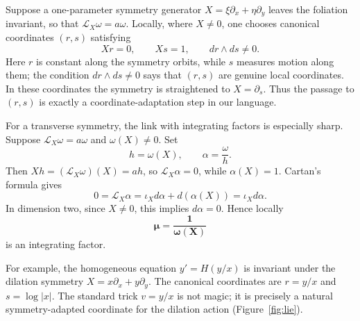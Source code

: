 \documentclass[11pt]{article}
\theoremstyle{definition}
\newcommand{\Lie}{\mathcal{L}}
\begin{document}
Suppose a one-parameter symmetry generator \(X=\xi\partial_x+\eta\partial_y\) leaves the foliation invariant, so that \(\Lie_X\omega=a\omega\). Locally, where \(X\neq0\), one chooses canonical coordinates \((r,s)\) satisfying
\[
Xr=0,\qquad Xs=1,\qquad dr\wedge ds\neq0.
\]
Here \(r\) is constant along the symmetry orbits, while \(s\) measures motion along them; the condition \(dr\wedge ds\neq0\) says that \((r,s)\) are genuine local coordinates. In these coordinates the symmetry is straightened to \(X=\partial_s\). Thus the passage to \((r,s)\) is exactly a coordinate-adaptation step in our language.

For a transverse symmetry, the link with integrating factors is especially sharp. Suppose \(\Lie_X\omega=a\omega\) and \(\omega(X)\neq0\). Set
\[
 h=\omega(X),\qquad \alpha=\frac{\omega}{h}.
\]
Then \(Xh=(\Lie_X\omega)(X)=ah\), so \(\Lie_X\alpha=0\), while \(\alpha(X)=1\). Cartan's formula gives
\[
0=\Lie_X\alpha=\iota_X d\alpha+d(\alpha(X))=\iota_X d\alpha.
\]
In dimension two, since \(X\neq0\), this implies \(d\alpha=0\). Hence locally
\[
\boldsymbol{\mu=\frac{1}{\omega(X)}}
\]
is an integrating factor. 

For example, the homogeneous equation \(y'=H(y/x)\) is invariant under the dilation symmetry \(X=x\partial_x+y\partial_y\). The canonical coordinates are \(r=y/x\) and \(s=\log|x|\). The standard trick \(v=y/x\) is not magic; it is precisely a natural symmetry-adapted coordinate for the dilation action (Figure~\ref{fig:lie}).
\end{document}

